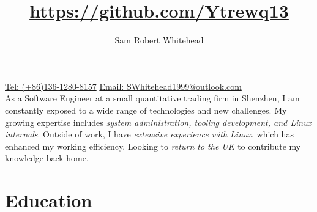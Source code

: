 



\title{\url{https://github.com/Ytrewq13}}
\author{Sam Robert Whitehead}

\maketitle

\pagestyle{empty}
\thispagestyle{empty}

\href{tel:(+86)13612808157}{Tel: (+86)136-1280-8157} \hfill
\href{mailto:SWhitehead1999@outlook.com}{Email: SWhitehead1999@outlook.com}
\\
As a Software Engineer at a small quantitative trading firm in Shenzhen, I
am constantly exposed to a wide range of technologies and new challenges. My
growing expertise includes \emph{system administration, tooling development,
and Linux internals}. Outside of work, I have \emph{extensive experience with
Linux}, which has enhanced my working efficiency. Looking to \emph{return to
the UK} to contribute my knowledge back home.

\section{Education}
